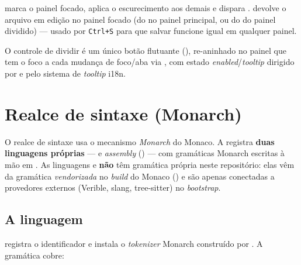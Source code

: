  marca o painel focado, aplica o escurecimento aos
demais e dispara . 
devolve o arquivo em edição no painel focado (do  no
painel principal, ou do  do painel dividido) --- usado por
\lstinline|Ctrl+S| para que salvar funcione igual em qualquer painel.

O controle de dividir é um único botão flutuante (),
re-aninhado no painel que tem o foco a cada mudança de foco/aba via
, com estado \emph{enabled}/\emph{tooltip} dirigido por
 e pelo sistema de \emph{tooltip} i18n.

\section{Realce de sintaxe (Monarch)}
\label{sec:editor-syntax}

O realce de sintaxe usa o mecanismo \emph{Monarch} do Monaco. A 
registra \textbf{duas linguagens próprias} --- \cmm{} e \emph{assembly} ()
--- com gramáticas Monarch escritas à mão em . As
linguagens  e  \textbf{não} têm gramática
própria neste repositório: elas vêm da gramática \emph{vendorizada} no \emph{build}
do Monaco () e são
apenas conectadas a provedores externos (Verible, slang, tree-sitter) no
\emph{bootstrap}.

\subsection{A linguagem \cmm}
\label{sec:editor-cmm}

 registra o identificador  e instala o
\emph{tokenizer} Monarch construído por . A gramática
cobre:

